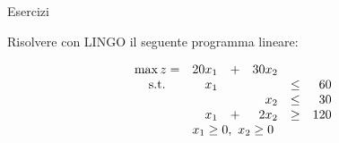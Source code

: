 \documentclass{beamer}
\begin{document}
\generatitolo
\begin{frame}%
{Esercizi}

Risolvere con LINGO il seguente programma lineare:

\begin{enumerate}
{\footnotesize \item
$$\begin{array}{crrrcr}
\max z=& 20 x_1 &+& 30 x_2\\
{\rm s.t.} &  x_1 & &      & \leq &  60 \\
           &      & &  x_2 & \leq &  30 \\
           &  x_1 &+&2 x_2 & \geq & 120 \\
           \multicolumn{6}{c}{x_1 \geq 0,\ x_2 \geq 0}
\end{array}%
$$%
}
\end{enumerate}

\end{frame}
\end{document}
